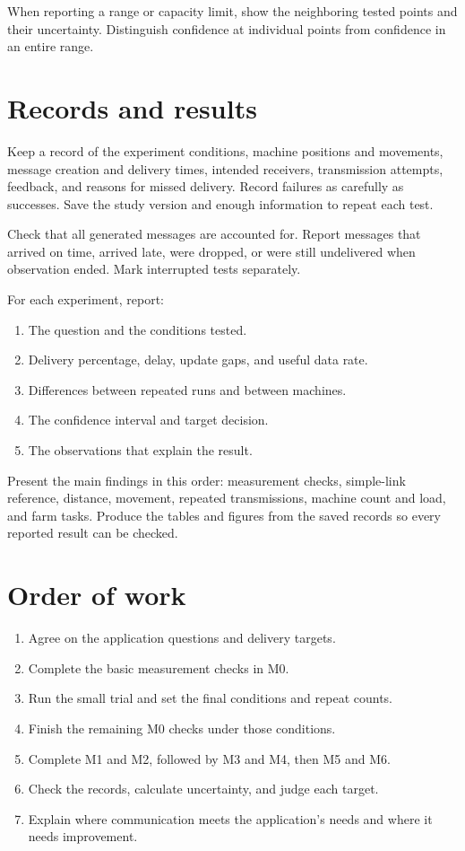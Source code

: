 \documentclass[11pt,a4paper]{article}
\begin{document}
When reporting a range or capacity limit, show the neighboring tested points
and their uncertainty. Distinguish confidence at individual points from
confidence in an entire range.

\section{Records and results}

Keep a record of the experiment conditions, machine positions and movements,
message creation and delivery times, intended receivers, transmission attempts,
feedback, and reasons for missed delivery. Record failures as carefully as
successes. Save the study version and enough information to repeat each test.

Check that all generated messages are accounted for. Report messages that
arrived on time, arrived late, were dropped, or were still undelivered when
observation ended. Mark interrupted tests separately.

For each experiment, report:
\begin{enumerate}
  \item The question and the conditions tested.
  \item Delivery percentage, delay, update gaps, and useful data rate.
  \item Differences between repeated runs and between machines.
  \item The confidence interval and target decision.
  \item The observations that explain the result.
\end{enumerate}

Present the main findings in this order: measurement checks, simple-link
reference, distance, movement, repeated transmissions, machine count and
load, and farm tasks. Produce the tables and figures from the saved records
so every reported result can be checked.

\section{Order of work}

\begin{enumerate}
  \item Agree on the application questions and delivery targets.
  \item Complete the basic measurement checks in M0.
  \item Run the small trial and set the final conditions and repeat counts.
  \item Finish the remaining M0 checks under those conditions.
  \item Complete M1 and M2, followed by M3 and M4, then M5 and M6.
  \item Check the records, calculate uncertainty, and judge each target.
  \item Explain where communication meets the application's needs and where
        it needs improvement.
\end{enumerate}
\end{document}
